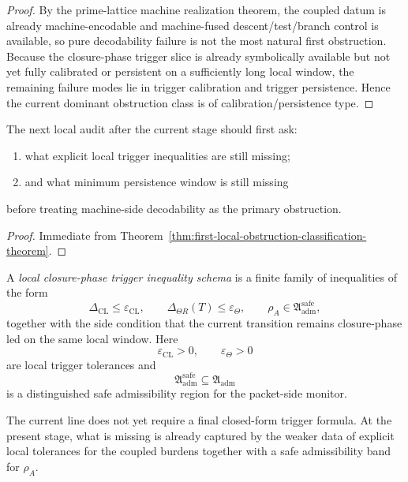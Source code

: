 \begin{proof}
By the prime-lattice machine realization theorem, the coupled datum is already machine-encodable and machine-fused descent/test/branch control is available, so pure decodability failure is not the most natural first obstruction.
Because the closure-phase trigger slice is already symbolically available but not yet fully calibrated or persistent on a sufficiently long local window, the remaining failure modes lie in trigger calibration and trigger persistence.
Hence the current dominant obstruction class is of calibration/persistence type.
\end{proof}

\begin{corollary}
\label{cor:next-post-v3320-local-audit-question}
The next local audit after the current stage should first ask:
\begin{enumerate}
 \item what explicit local trigger inequalities are still missing;
 \item and what minimum persistence window is still missing
\end{enumerate}
before treating machine-side decodability as the primary obstruction.
\end{corollary}

\begin{proof}
Immediate from Theorem~\ref{thm:first-local-obstruction-classification-theorem}.
\end{proof}

\begin{definition}
\label{def:local-closure-phase-trigger-inequality-schema}
A \emph{local closure-phase trigger inequality schema} is a finite family of inequalities of the form
\[
\Delta_{\mathrm{CL}} \le \varepsilon_{\mathrm{CL}},
\qquad
\Delta_{\Theta R}(T) \le \varepsilon_{\Theta},
\qquad
\rho_A \in \mathfrak{A}_{\mathrm{adm}}^{\mathrm{safe}},
\]
together with the side condition that the current transition remains closure-phase led on the same local window.
Here
\[
\varepsilon_{\mathrm{CL}}>0,
\qquad
\varepsilon_{\Theta}>0
\]
are local trigger tolerances and
\[
\mathfrak{A}_{\mathrm{adm}}^{\mathrm{safe}}\subseteq \mathfrak{A}_{\mathrm{adm}}
\]
is a distinguished safe admissibility region for the packet-side monitor.
\end{definition}

\begin{remark}
\label{rem:meaning-of-the-inequality-schema}
The current line does not yet require a final closed-form trigger formula.
At the present stage, what is missing is already captured by the weaker data of explicit local tolerances for the coupled burdens together with a safe admissibility band for \(\rho_A\).
\end{remark}

